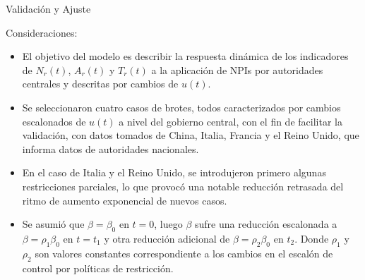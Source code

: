 \documentclass{beamer}
\begin{document}
\begin{frame}{Validación y Ajuste}
\begin{justify}

{\footnotesize
Consideraciones:
\begin{itemize}
\justifying
    \item El objetivo del modelo es describir la respuesta dinámica de los indicadores de $N_r(t)$, $A_r(t)$ y $T_r(t)$ a la aplicación de NPIs por autoridades centrales y descritas por cambios de $u(t)$.
    \vspace{0.3cm}
    \item Se seleccionaron cuatro casos de brotes, todos caracterizados por cambios escalonados de $u(t)$ a nivel del gobierno central, con el fin de facilitar la validación, con datos tomados de China, Italia, Francia y el Reino Unido, que informa datos de autoridades nacionales.
    \vspace{0.3cm}
    \item En el caso de Italia y el Reino Unido, se introdujeron primero algunas restricciones parciales, lo que provocó una notable reducción retrasada del ritmo de aumento exponencial de nuevos casos.
    \vspace{0.3cm}
    \item Se asumió que $\beta = \beta_0$ en $t=0$, luego $\beta$ sufre una reducción escalonada a $\beta = \rho_1 \beta_0$ en $t= t_1$ y otra reducción adicional de  $\beta = \rho_2 \beta_0$ en $t_2$. Donde $\rho_1$ y $\rho_2$ son valores constantes correspondiente a los cambios en el escalón de control por políticas de restricción.
    \vspace{0.3cm}
    
\end{itemize}
}

\end{justify}
\end{frame}
\end{document}

